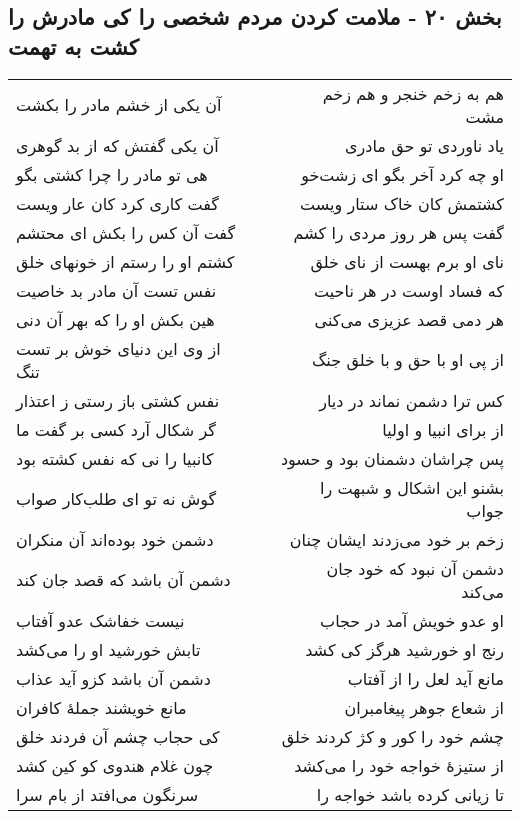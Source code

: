 \begin{center}
\section*{بخش ۲۰ - ملامت کردن مردم شخصی را کی مادرش را کشت به تهمت}
\label{sec:sh020}
\begin{longtable}{l p{0.5cm} r}
آن یکی از خشم مادر را بکشت
&&
هم به زخم خنجر و هم زخم مشت
\\
آن یکی گفتش که از بد گوهری
&&
یاد ناوردی تو حق مادری
\\
هی تو مادر را چرا کشتی بگو
&&
او چه کرد آخر بگو ای زشت‌خو
\\
گفت کاری کرد کان عار ویست
&&
کشتمش کان خاک ستار ویست
\\
گفت آن کس را بکش ای محتشم
&&
گفت پس هر روز مردی را کشم
\\
کشتم او را رستم از خونهای خلق
&&
نای او برم بهست از نای خلق
\\
نفس تست آن مادر بد خاصیت
&&
که فساد اوست در هر ناحیت
\\
هین بکش او را که بهر آن دنی
&&
هر دمی قصد عزیزی می‌کنی
\\
از وی این دنیای خوش بر تست تنگ
&&
از پی او با حق و با خلق جنگ
\\
نفس کشتی باز رستی ز اعتذار
&&
کس ترا دشمن نماند در دیار
\\
گر شکال آرد کسی بر گفت ما
&&
از برای انبیا و اولیا
\\
کانبیا را نی که نفس کشته بود
&&
پس چراشان دشمنان بود و حسود
\\
گوش نه تو ای طلب‌کار صواب
&&
بشنو این اشکال و شبهت را جواب
\\
دشمن خود بوده‌اند آن منکران
&&
زخم بر خود می‌زدند ایشان چنان
\\
دشمن آن باشد که قصد جان کند
&&
دشمن آن نبود که خود جان می‌کند
\\
نیست خفاشک عدو آفتاب
&&
او عدو خویش آمد در حجاب
\\
تابش خورشید او را می‌کشد
&&
رنج او خورشید هرگز کی کشد
\\
دشمن آن باشد کزو آید عذاب
&&
مانع آید لعل را از آفتاب
\\
مانع خویشند جملهٔ کافران
&&
از شعاع جوهر پیغامبران
\\
کی حجاب چشم آن فردند خلق
&&
چشم خود را کور و کژ کردند خلق
\\
چون غلام هندوی کو کین کشد
&&
از ستیزهٔ خواجه خود را می‌کشد
\\
سرنگون می‌افتد از بام سرا
&&
تا زیانی کرده باشد خواجه را
\\

\end{longtable}
\end{center}
